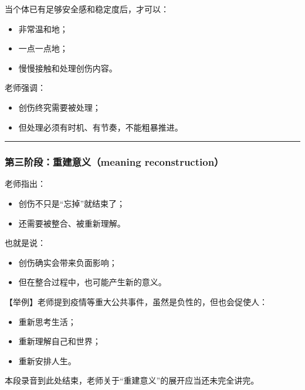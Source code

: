 \documentclass[
  chinese,
  9pt,
  a4paper,
]{ctexart}
\providecommand{\tightlist}{%
  \setlength{\itemsep}{0pt}\setlength{\parskip}{0pt}}
\begin{document}
当个体已有足够安全感和稳定度后，才可以：

\begin{itemize}
\tightlist
\item
  非常温和地；
\item
  一点一点地；
\item
  慢慢接触和处理创伤内容。
\end{itemize}

老师强调：

\begin{itemize}
\tightlist
\item
  创伤终究需要被处理；
\item
  但处理必须有时机、有节奏，不能粗暴推进。
\end{itemize}

\begin{center}\rule{0.5\linewidth}{0.5pt}\end{center}

\subsubsection{第三阶段：重建意义（meaning
reconstruction）}\label{ux7b2cux4e09ux9636ux6bb5ux91cdux5efaux610fux4e49meaning-reconstruction}

老师指出：

\begin{itemize}
\tightlist
\item
  创伤不只是``忘掉''就结束了；
\item
  还需要被整合、被重新理解。
\end{itemize}

也就是说：

\begin{itemize}
\tightlist
\item
  创伤确实会带来负面影响；
\item
  但在整合过程中，也可能产生新的意义。
\end{itemize}

【举例】老师提到疫情等重大公共事件，虽然是负性的，但也会促使人：

\begin{itemize}
\tightlist
\item
  重新思考生活；
\item
  重新理解自己和世界；
\item
  重新安排人生。
\end{itemize}

本段录音到此处结束，老师关于``重建意义''的展开应当还未完全讲完。
\end{document}
